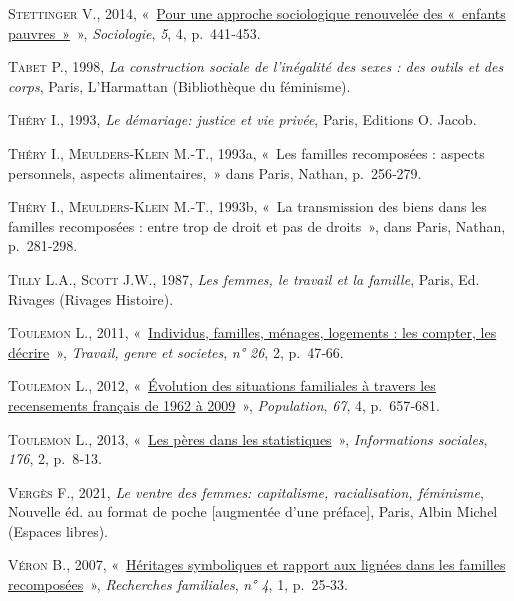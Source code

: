 \documentclass[
  12pt,
]{book}
\newlength{\cslhangindent}
\newenvironment{CSLReferences}[2] %
 {\begin{list}{}{%
  \setlength{\itemindent}{0pt}
  \setlength{\leftmargin}{0pt}
  \setlength{\parsep}{0pt}
  \ifodd #1
   \setlength{\leftmargin}{\cslhangindent}
   \setlength{\itemindent}{-1\cslhangindent}
  \fi
  \setlength{\itemsep}{#2\baselineskip}}}
 {\end{list}}
\begin{document}
\begin{CSLReferences}{0}{1}
\textsc{Stettinger V.}, 2014,
{«~\href{https://doi.org/10.3917/socio.054.0441}{Pour une approche
sociologique renouvelée des «~enfants pauvres~»}~»}, \emph{Sociologie},
\emph{5}, 4, p.~441‑453.

\textsc{Tabet P.}, 1998, \emph{La construction sociale de l'inégalité
des sexes : des outils et des corps}, Paris, L'Harmattan (Bibliothèque
du féminisme).

\textsc{Théry I.}, 1993, \emph{Le démariage: justice et vie privée},
Paris, Editions O. Jacob.

\textsc{Théry I.}, \textsc{Meulders-Klein M.-T.}, 1993a, {«~Les familles
recomposées : aspects personnels, aspects alimentaires,~»} dans Paris,
Nathan, p.~256‑279.

\textsc{Théry I.}, \textsc{Meulders-Klein M.-T.}, 1993b, {«~La
transmission des biens dans les familles recomposées : entre trop de
droit et pas de droits~»}, dans Paris, Nathan, p.~281‑298.

\textsc{Tilly L.A.}, \textsc{Scott J.W.}, 1987, \emph{Les femmes, le
travail et la famille}, Paris, Ed. Rivages (Rivages Histoire).

\textsc{Toulemon L.}, 2011,
{«~\href{https://www.cairn.info/revue-travail-genre-et-societes-2011-2-page-47.htm}{Individus,
familles, ménages, logements : les compter, les décrire}~»},
\emph{Travail, genre et societes}, \emph{n° 26}, 2, p.~47‑66.

\textsc{Toulemon L.}, 2012,
{«~\href{https://doi.org/10.3917/popu.1204.0657}{Évolution des
situations familiales à travers les recensements français de 1962 à
2009}~»}, \emph{Population}, \emph{67}, 4, p.~657‑681.

\textsc{Toulemon L.}, 2013,
{«~\href{https://doi.org/10.3917/inso.176.0008}{Les pères dans les
statistiques}~»}, \emph{Informations sociales}, \emph{176}, 2, p.~8‑13.

\textsc{Vergès F.}, 2021, \emph{Le ventre des femmes: capitalisme,
racialisation, féminisme}, Nouvelle éd. au format de poche {[}augmentée
d'une préface{]}, Paris, Albin Michel (Espaces libres).

\textsc{Véron B.}, 2007,
{«~\href{http://www.cairn.info/revue-recherches-familiales-2007-1-page-25.htm}{Héritages
symboliques et rapport aux lignées dans les familles recomposées}~»},
\emph{Recherches familiales}, \emph{n° 4}, 1, p.~25‑33.


\end{CSLReferences}
\end{document}
